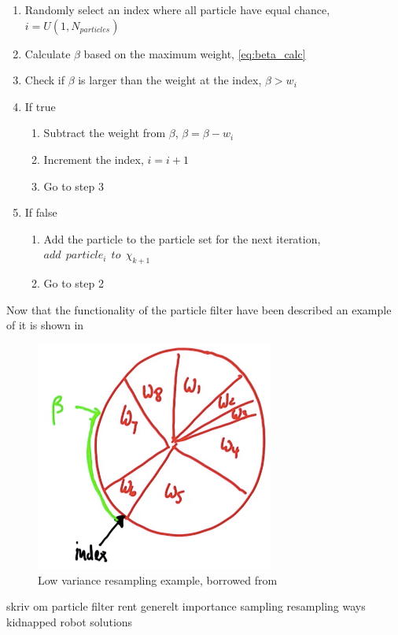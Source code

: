 \documentclass[Main]{subfiles}
\begin{document}
\begin{enumerate}
\item Randomly select an index where all particle have equal chance, $i = U(1,N_{particles})$ 
\item Calculate $\beta$ based on the maximum weight, \autoref{eq:beta_calc}
\item Check if $\beta$ is larger than the weight at the index, $\beta > w_i$
\item If true
\begin{enumerate}
	\item Subtract the weight from $\beta$, $\beta = \beta-w_i$
	\item Increment the index, $i = i+1$
	\item Go to step 3	
\end{enumerate}
\item If false
\begin{enumerate}
	\item Add the particle to the particle set for the next iteration, $add \:\: particle_i \:\: to \:\: \chi_{k+1}$
	\item Go to step 2
\end{enumerate}
\end{enumerate}
Now that the functionality of the particle filter have been described an example of it is shown in 
\begin{figure}[H]
	\centering
	\includegraphics[width=0.3\linewidth]{./Figures/low_var_resampling.png}
	\caption{Low variance resampling example, borrowed from \citep{Thrun2002}}
	\label{fig:low_var_resampling}
\end{figure}\noindent

skriv om particle filter rent generelt
importance sampling
resampling ways
kidnapped robot solutions

\end{document}

